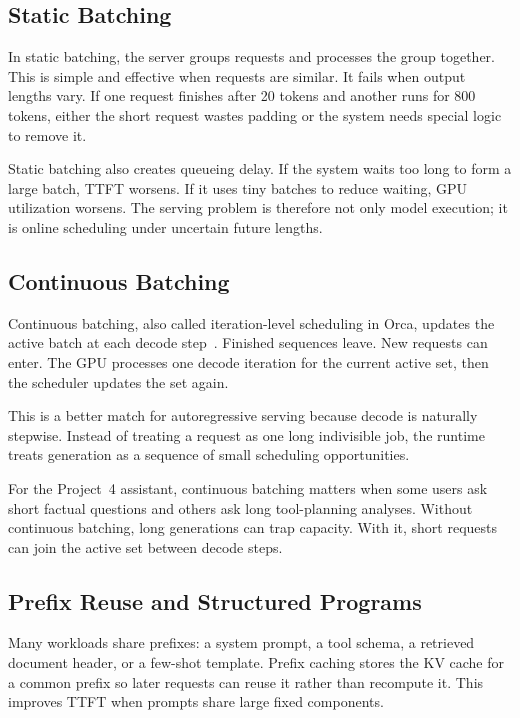 \subsection{Static Batching}

In static batching, the server groups requests and processes the group together. This is simple and effective when requests are similar. It fails when output lengths vary. If one request finishes after 20 tokens and another runs for 800 tokens, either the short request wastes padding or the system needs special logic to remove it.

Static batching also creates queueing delay. If the system waits too long to form a large batch, TTFT worsens. If it uses tiny batches to reduce waiting, GPU utilization worsens. The serving problem is therefore not only model execution; it is online scheduling under uncertain future lengths.

\subsection{Continuous Batching}

Continuous batching, also called iteration-level scheduling in Orca, updates the active batch at each decode step~\cite{yu2022orca}. Finished sequences leave. New requests can enter. The GPU processes one decode iteration for the current active set, then the scheduler updates the set again.

This is a better match for autoregressive serving because decode is naturally stepwise. Instead of treating a request as one long indivisible job, the runtime treats generation as a sequence of small scheduling opportunities.

For the Project~4 assistant, continuous batching matters when some users ask short factual questions and others ask long tool-planning analyses. Without continuous batching, long generations can trap capacity. With it, short requests can join the active set between decode steps.

\subsection{Prefix Reuse and Structured Programs}

Many workloads share prefixes: a system prompt, a tool schema, a retrieved document header, or a few-shot template. Prefix caching stores the KV cache for a common prefix so later requests can reuse it rather than recompute it. This improves TTFT when prompts share large fixed components.

